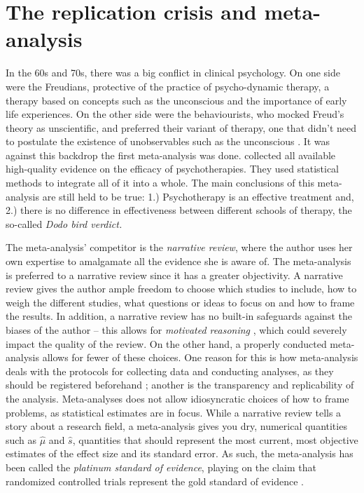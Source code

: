\section{The replication crisis and meta-analysis}

In the 60s and 70s, there was a big conflict in clinical psychology. On one side were the Freudians, protective of the practice of psycho-dynamic therapy, a therapy based on concepts such as the unconscious and the importance of early life experiences. On the other side were the behaviourists, who mocked Freud's theory as unscientific, and preferred their variant of therapy, one that didn't need to postulate the existence of unobservables such as the unconscious \parencite[Chapter 4]{Wampold2019-fe}. It was against this backdrop the first meta-analysis was done. \textcite{Smith1977-vw} collected all available high-quality evidence on the efficacy of psychotherapies. They used statistical methods to integrate all of it into a whole. The main conclusions of this meta-analysis are still held to be true: 1.) Psychotherapy is an effective treatment and, 2.) there is no difference in effectiveness between different schools of therapy, the so-called \emph{Dodo bird verdict.}

The meta-analysis' competitor is the \emph{narrative review}, where the author uses her own expertise to amalgamate all the evidence she is aware of. The meta-analysis is preferred to a narrative review since it has a greater objectivity. A narrative review gives the author ample freedom to choose which studies to include, how to weigh the different studies, what questions or ideas to focus on and how to frame the results. In addition, a narrative review has no built-in safeguards against the biases of the author -- this allows for \emph{motivated reasoning} , which could severely impact the quality of the review. On the other hand, a properly conducted meta-analysis allows for fewer of these choices. One reason for this is how meta-analysis deals with the protocols for collecting data and conducting analyses, as they should be registered beforehand ; another is the transparency and replicability of the analysis. Meta-analyses does not allow idiosyncratic choices of how to frame problems, as statistical estimates are in focus. While a narrative review tells a story about a research field, a meta-analysis gives you dry, numerical quantities such as $\widehat{\mu}$ and $\widehat{s}$, quantities that should represent the most current, most objective estimates of the effect size and its standard error. As such, the meta-analysis has been called the \emph{platinum standard of evidence}, playing on the claim that randomized controlled trials represent the gold standard of evidence .


